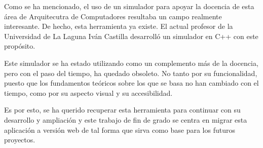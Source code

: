 Como se ha mencionado, el uso de un simulador para apoyar la docencia de esta área
de Arquitecutra de Computadores resultaba un campo realmente interesante. De hecho,
esta herramienta ya existe. El actual profesor de la Universidad de La Laguna 
Iván Castilla desarrolló un simulador en C++ con este propósito.

\bigskip
Este simulador se ha estado utilizando como un complemento más de la docencia, pero
con el paso del tiempo, ha quedado obsoleto. No tanto por su funcionalidad, puesto
que los fundamentos teóricos sobre los que se basa no han cambiado con el tiempo, como 
por su aspecto visual y su accesibilidad.

\bigskip
Es por esto, se ha querido recuperar esta herramienta para continuar con su desarrollo 
y ampliación y este trabajo de fin de grado se centra en migrar esta aplicación a versión 
web de tal forma que sirva como base para los futuros proyectos.

